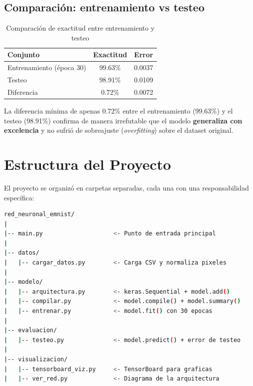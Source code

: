 \documentclass[12pt,a4paper]{article}
\begin{document}
\subsection{Comparación: entrenamiento vs testeo}

\begin{table}[H]
    \centering
    \begin{tabular}{@{}lcc@{}}
        \toprule
        \textbf{Conjunto} & \textbf{Exactitud} & \textbf{Error} \\
        \midrule
        Entrenamiento (época 30) & 99.63\% & 0.0037 \\
        Testeo & 98.91\% & 0.0109 \\
        \midrule
        Diferencia & 0.72\% & 0.0072 \\
        \bottomrule
    \end{tabular}
    \caption{Comparación de exactitud entre entrenamiento y testeo}
\end{table}

La diferencia mínima de apenas 0.72\% entre el entrenamiento (99.63\%) y el testeo (98.91\%) confirma de manera irrefutable que el modelo \textbf{generaliza con excelencia} y no sufrió de sobreajuste (\textit{overfitting}) sobre el dataset original.

\section{Estructura del Proyecto}

El proyecto se organizó en carpetas separadas, cada una con una responsabilidad específica:

\begin{lstlisting}[language=bash, caption=Estructura de carpetas del proyecto]
red_neuronal_emnist/
|
|-- main.py                    <- Punto de entrada principal
|
|-- datos/
|   |-- cargar_datos.py        <- Carga CSV y normaliza pixeles
|
|-- modelo/
|   |-- arquitectura.py        <- keras.Sequential + model.add()
|   |-- compilar.py            <- model.compile() + model.summary()
|   |-- entrenar.py            <- model.fit() con 30 epocas
|
|-- evaluacion/
|   |-- testeo.py              <- model.predict() + error de testeo
|
|-- visualizacion/
|   |-- tensorboard_viz.py     <- TensorBoard para graficas
|   |-- ver_red.py             <- Diagrama de la arquitectura
\end{lstlisting}
\end{document}
